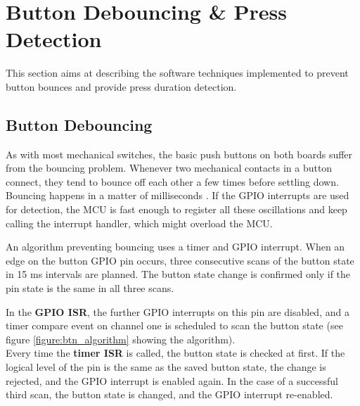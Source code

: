     
        
        
        
        
    
    
    
\section{Button Debouncing \& Press Detection}
    \label{sec:fw_buttons}
    This section aims at describing the software techniques implemented to prevent button bounces and provide press duration detection.
    
    \subsection{Button Debouncing}
        As with most mechanical switches, the basic push buttons on both boards suffer from the bouncing problem. Whenever two mechanical contacts in a button connect, they tend to bounce off each other a few times before settling down. Bouncing happens in a matter of milliseconds \cite{web_article:bouncing}. If the GPIO interrupts are used for detection, the MCU is fast enough to register all these oscillations and keep calling the interrupt handler, which might overload the MCU.
        
        An algorithm preventing bouncing uses a timer and GPIO interrupt. When an edge on the button GPIO pin occurs, three consecutive scans of the button state in 15 ms intervals are planned. The button state change is confirmed only if the pin state is the same in all three scans.
        
        In the \textbf{GPIO ISR}, the further GPIO interrupts on this pin are disabled, and a timer compare event on channel one is scheduled to scan the button state (see figure \ref{figure:btn_algorithm} showing the algorithm).\\
        Every time the \textbf{timer ISR} is called, the button state is checked at first. If the logical level of the pin is the same as the saved button state, the change is rejected, and the GPIO interrupt is enabled again. In the case of a successful third scan, the button state is changed, and the GPIO interrupt re-enabled.
        

